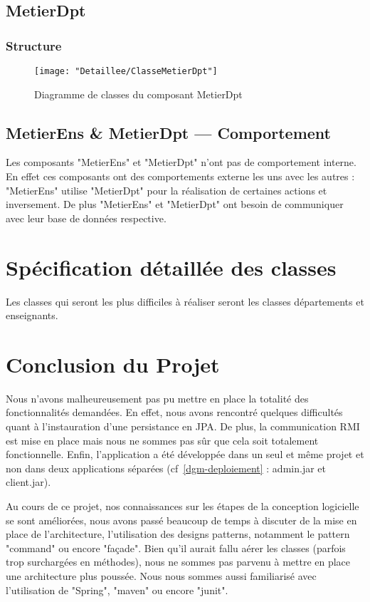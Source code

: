     \FloatBarrier
    \subsection{MetierDpt}
      
    \subsubsection{Structure}
    
    \begin{figure}[!htbp]
    \begin{center}
    \texttt{[image: "Detaillee/ClasseMetierDpt"]}
    \caption{Diagramme de classes du composant MetierDpt}
    \label{classe-metierDpt}
    \end{center}
    \end{figure}
    
    \FloatBarrier
    \subsection{MetierEns \& MetierDpt --- Comportement}
    
     Les composants "MetierEns" et "MetierDpt" n'ont pas de comportement interne.
     En effet ces composants ont des comportements externe les uns avec les autres : "MetierEns" utilise "MetierDpt" pour la réalisation de certaines actions et inversement. De plus "MetierEns" et "MetierDpt" ont besoin de communiquer avec leur base de données respective.

\section{Spécification détaillée des classes}
    
    Les classes qui seront les plus difficiles à réaliser seront les classes départements et enseignants.
    

\section{Conclusion du Projet}
    
    Nous n'avons malheureusement pas pu mettre en place la totalité des fonctionnalités demandées. En effet, nous avons rencontré quelques difficultés quant à l'instauration d'une persistance en JPA. De plus, la communication RMI est mise en place mais nous ne sommes pas sûr que cela soit totalement fonctionnelle. Enfin, l'application a été développée dans un seul et même projet et non dans deux applications séparées (cf~\ref{dgm-deploiement} : admin.jar et client.jar). 
    
    Au cours de ce projet, nos connaissances sur les étapes de la conception logicielle se sont améliorées, nous avons passé beaucoup de temps à discuter de la mise en place de l'architecture, l'utilisation des designs patterns, notamment le pattern "command" ou encore "façade". Bien qu'il aurait fallu aérer les classes (parfois trop surchargées en méthodes), nous ne sommes pas parvenu à mettre en place une architecture plus poussée. Nous nous sommes aussi familiarisé avec l'utilisation de "Spring", "maven" ou encore "junit".
  
